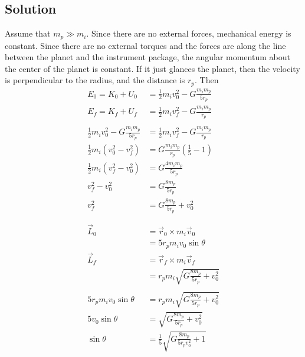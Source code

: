 \documentclass[solutions]{esg8012pset}
\begin{document}
\subsection*{Solution}
  Assume that $m_p \gg m_i$.  Since there are no external forces, mechanical energy is constant.  Since there are no external torques and the forces are along the line between the planet and the instrument package, the angular momentum about the center of the planet is constant.  If it just glances the planet, then the velocity is perpendicular to the radius, and the distance is $r_p$.  Then
  \begin{align*}
    E_0 = K_0 + U_0 & = \frac{1}{2}m_i v_0^2 - G\frac{m_i m_p}{5 r_p} \\
    E_f = K_f + U_f & = \frac{1}{2}m_i v_f^2 - G\frac{m_i m_p}{r_p} \\
    \\
    \frac{1}{2}m_i v_0^2 - G\frac{m_i m_p}{5 r_p} & = \frac{1}{2}m_i v_f^2 - G\frac{m_i m_p}{r_p} \\
    \frac{1}{2}m_i \left(v_0^2 - v_f^2\right) & = G \frac{m_i m_p}{r_p} \left(\frac{1}{5} - 1\right) \\
    \frac{1}{2}m_i \left(v_f^2 - v_0^2\right) & = G \frac{4 m_i m_p}{5 r_p} \\
    v_f^2 - v_0^2 & = G \frac{8 m_p}{5 r_p} \\
    v_f^2 & = G \frac{8 m_p}{5 r_p} + v_0^2 \\
    \\
    \\
    \vec L_0 & = \vec r_0 \times m_i \vec v_0 \\
    & = 5 r_p m_i v_0\sin\theta \\
    \vec L_f & = \vec r_f \times m_i \vec v_f \\
    & = r_p m_i \sqrt{G \frac{8 m_p}{5 r_p} + v_0^2} \\
    \\
    5 r_p m_i v_0\sin\theta & = r_p m_i \sqrt{G \frac{8 m_p}{5 r_p} + v_0^2} \\
    5 v_0\sin\theta & = \sqrt{G \frac{8 m_p}{5 r_p} + v_0^2} \\
    \sin\theta & = \frac{1}{5}\sqrt{G \frac{8 m_p}{5 r_p v_0^2} + 1}
  \end{align*}
\end{document}
